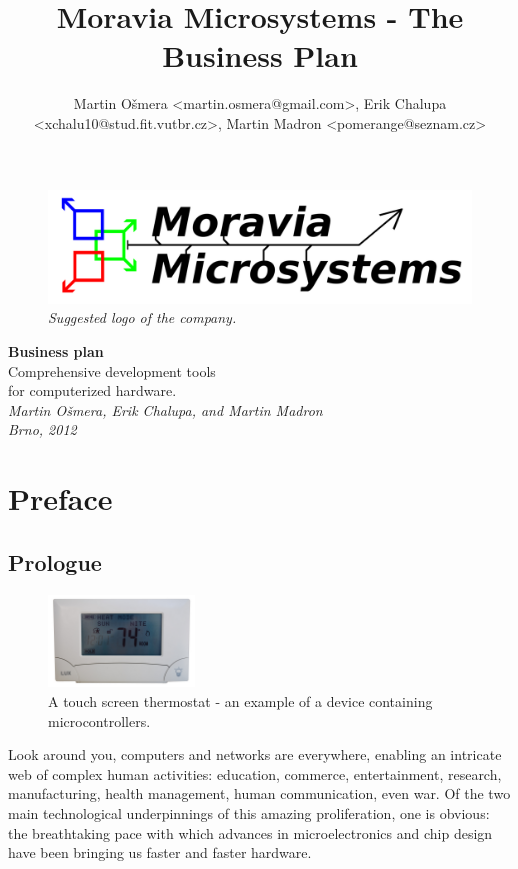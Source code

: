 \documentclass[a4paper,twoside,15pt]{book}
\title{Moravia Microsystems - The Business Plan}
\author{Martin Ošmera <martin.osmera@gmail.com>, Erik Chalupa <xchalu10@stud.fit.vutbr.cz>, Martin Madron <pomerange@seznam.cz>}
\begin{document}
\begin{titlepage}
	\begin{figure}[ht!]
		\centering{}
		\includegraphics[width=.9\textwidth]{images/Moravia_Microsystems.png}
		\caption{\textit{Suggested logo of the company.}}
	\end{figure}
	\begin{center}
		\fontsize{35.83pt}{60pt} \selectfont{}
		\textbf{Business plan}
		\\[2cm]
		\fontsize{25pt}{30pt} \selectfont{}
		Comprehensive development tools\\
		for computerized hardware.
		\\[1cm]
		\fontsize{14.4pt}{20pt} \selectfont{}
		\textit{Martin Ošmera, Erik Chalupa, and Martin Madron \\ Brno, 2012}
	\end{center}
\end{titlepage}

\tableofcontents

\chapter{Preface}
	\section{Prologue}
		\begin{figure}
			\centering{}
			\includegraphics[width=110pt]{images/Lux_Products_Touch_Screen_Thermostat.jpg}
			\caption{A touch screen thermostat - an example of a device containing microcontrollers.}
		\end{figure}
		Look around you, computers and networks are everywhere, enabling an intricate web of complex human activities: education, commerce, entertainment, research, manufacturing, health management, human communication, even war. Of the two main technological underpinnings of this amazing proliferation, one is obvious: the breathtaking pace with which advances in microelectronics and chip design have been bringing us faster and faster hardware.
\end{document}
